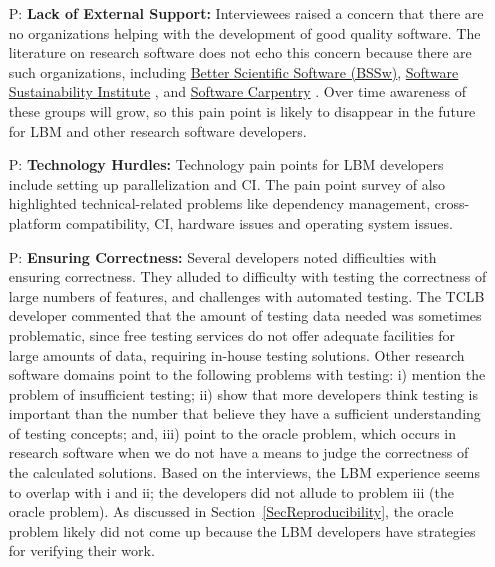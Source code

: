 \documentclass[final, 3p, times, authoryear]{elsarticle}
\newcounter{pnum} %
\begin{document}
\begin{enumerate}
	\item[P\refstepcounter{pnum}\thepnum \label{P_LackExtSupport}:] \textbf{Lack
	of External Support:} Interviewees raised a concern that there are no
	organizations helping with the development of good quality software.  The
	literature on research software does not echo this concern because
	there are such organizations, including \href{https://bssw.io/} {Better
	Scientific Software (BSSw)},
	\href{https://www.software.ac.uk/} {Software Sustainability Institute}
	\citep{CrouchEtAl2013}, and \href{https://software-carpentry.org/}{Software
	Carpentry} \citep{WilsonAndLumsdaine2006, Wilson2016}. Over time awareness
	of these groups will grow, so this pain point is likely to disappear in the
	future for LBM and other research software developers.
	
	\item[P\refstepcounter{pnum}\thepnum \label{P_TechnologyHurdles}:]
	\textbf{Technology Hurdles:} Technology pain points for LBM developers
	include setting up parallelization and CI. The pain
	point survey of \citet{WieseEtAl2019} also highlighted technical-related
	problems like dependency management, cross-platform compatibility,
	CI, hardware issues and operating system issues.

	\item[P\refstepcounter{pnum}\thepnum \label{P_Correctness}:]
	\textbf{Ensuring Correctness:} Several developers noted difficulties with
	ensuring correctness. They alluded to difficulty with testing the
	correctness of large numbers of features, and challenges with automated
	testing. The TCLB developer commented that the amount of testing data needed
	was sometimes problematic, since free testing services do not offer adequate
	facilities for large amounts of data, requiring in-house testing solutions.
	Other research software domains point to the following problems with
	testing: i) \citet{PintoEtAl2018} mention the problem of insufficient
	testing; ii) \citet{HannayEtAl2009} show that more developers
	think testing is important than the number that believe they have a
	sufficient understanding of testing concepts; and, iii) 
	\citet{HannayEtAl2009, KanewalaAndBieman2013, KellyEtAl2011, WieseEtAl2019}
	point to the oracle problem, which occurs in research software when we do
	not have a means to judge the correctness of the calculated solutions. Based
	on the interviews, the LBM experience seems to overlap with i and ii; the
	developers did not allude to problem iii (the oracle problem).  As discussed
	in Section~\ref{SecReproducibility}, the oracle problem likely did not come
	up because the LBM developers have strategies for verifying their work.
	

\end{enumerate}
\end{document}

